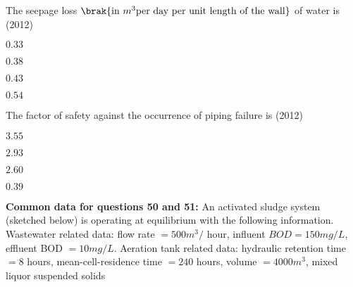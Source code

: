 	\item  The seepage loss $\brak{\text{in } m^{3} \text{per day per unit length of the wall}}$ of water is
	\hfill{(2012)}
		\begin{enumerate}
            \begin{multicols}{4}
			\item $0.33$
			\item $ 0.38$
			\item $ 0.43$
			\item $ 0.54$
   \end{multicols}
        	\end{enumerate}	
	\item The factor of safety against the occurrence of piping failure is
	\hfill{(2012)}
                \begin{enumerate}
                \begin{multicols}{4}
			\item $3.55$
			\item $2.93$
			\item $ 2.60$
			\item $ 0.39$
        	\end{multicols}
         \end{enumerate}		
\textbf{Common data for questions 50 and 51:}
       An activated sludge system (sketched below) is operating at equilibrium with the following information. Wastewater related data: flow rate $=500 m^{3} /$ hour, influent $BOD=150 mg / L$, effluent BOD $=10 mg / L$. Aeration tank related data: hydraulic retention time $=8$ hours, mean-cell-residence time $=240$ hours, volume $=4000 m^{3}$, mixed liquor suspended solids 
      
       
